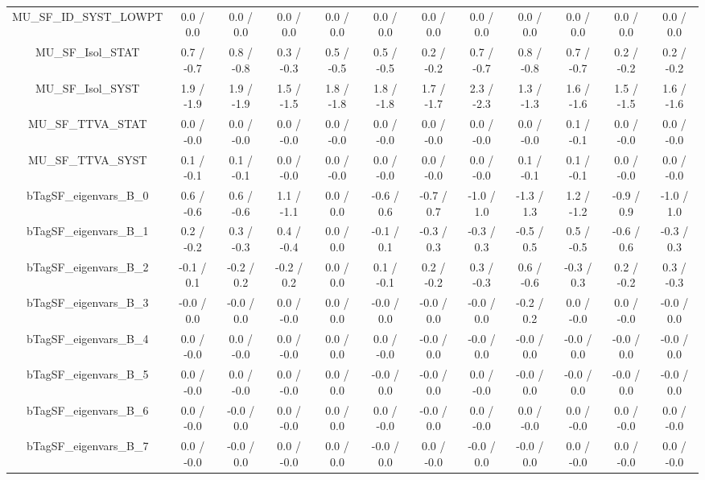 \begin{table}[htbp]
\begin{center}
\begin{tabular}{|c|c|c|c|c|c|c|c|c|c|c|c|}
  MU_SF_ID_SYST_LOWPT & 0.0 / 0.0 & 0.0 / 0.0 & 0.0 / 0.0 & 0.0 / 0.0 & 0.0 / 0.0 & 0.0 / 0.0 & 0.0 / 0.0 & 0.0 / 0.0 & 0.0 / 0.0 & 0.0 / 0.0 & 0.0 / 0.0 \\ 
  MU_SF_Isol_STAT & 0.7 / -0.7 & 0.8 / -0.8 & 0.3 / -0.3 & 0.5 / -0.5 & 0.5 / -0.5 & 0.2 / -0.2 & 0.7 / -0.7 & 0.8 / -0.8 & 0.7 / -0.7 & 0.2 / -0.2 & 0.2 / -0.2 \\ 
  MU_SF_Isol_SYST & 1.9 / -1.9 & 1.9 / -1.9 & 1.5 / -1.5 & 1.8 / -1.8 & 1.8 / -1.8 & 1.7 / -1.7 & 2.3 / -2.3 & 1.3 / -1.3 & 1.6 / -1.6 & 1.5 / -1.5 & 1.6 / -1.6 \\ 
  MU_SF_TTVA_STAT & 0.0 / -0.0 & 0.0 / -0.0 & 0.0 / -0.0 & 0.0 / -0.0 & 0.0 / -0.0 & 0.0 / -0.0 & 0.0 / -0.0 & 0.0 / -0.0 & 0.1 / -0.1 & 0.0 / -0.0 & 0.0 / -0.0 \\ 
  MU_SF_TTVA_SYST & 0.1 / -0.1 & 0.1 / -0.1 & 0.0 / -0.0 & 0.0 / -0.0 & 0.0 / -0.0 & 0.0 / -0.0 & 0.0 / -0.0 & 0.1 / -0.1 & 0.1 / -0.1 & 0.0 / -0.0 & 0.0 / -0.0 \\ 
  bTagSF_eigenvars_B_0 & 0.6 / -0.6 & 0.6 / -0.6 & 1.1 / -1.1 & 0.0 / 0.0 & -0.6 / 0.6 & -0.7 / 0.7 & -1.0 / 1.0 & -1.3 / 1.3 & 1.2 / -1.2 & -0.9 / 0.9 & -1.0 / 1.0 \\ 
  bTagSF_eigenvars_B_1 & 0.2 / -0.2 & 0.3 / -0.3 & 0.4 / -0.4 & 0.0 / 0.0 & -0.1 / 0.1 & -0.3 / 0.3 & -0.3 / 0.3 & -0.5 / 0.5 & 0.5 / -0.5 & -0.6 / 0.6 & -0.3 / 0.3 \\ 
  bTagSF_eigenvars_B_2 & -0.1 / 0.1 & -0.2 / 0.2 & -0.2 / 0.2 & 0.0 / 0.0 & 0.1 / -0.1 & 0.2 / -0.2 & 0.3 / -0.3 & 0.6 / -0.6 & -0.3 / 0.3 & 0.2 / -0.2 & 0.3 / -0.3 \\ 
  bTagSF_eigenvars_B_3 & -0.0 / 0.0 & -0.0 / 0.0 & 0.0 / -0.0 & 0.0 / 0.0 & -0.0 / 0.0 & -0.0 / 0.0 & -0.0 / 0.0 & -0.2 / 0.2 & 0.0 / -0.0 & 0.0 / -0.0 & -0.0 / 0.0 \\ 
  bTagSF_eigenvars_B_4 & 0.0 / -0.0 & 0.0 / -0.0 & 0.0 / -0.0 & 0.0 / 0.0 & 0.0 / -0.0 & -0.0 / 0.0 & -0.0 / 0.0 & -0.0 / 0.0 & -0.0 / 0.0 & -0.0 / 0.0 & -0.0 / 0.0 \\ 
  bTagSF_eigenvars_B_5 & 0.0 / -0.0 & 0.0 / -0.0 & 0.0 / -0.0 & 0.0 / 0.0 & -0.0 / 0.0 & -0.0 / 0.0 & 0.0 / -0.0 & -0.0 / 0.0 & -0.0 / 0.0 & -0.0 / 0.0 & -0.0 / 0.0 \\ 
  bTagSF_eigenvars_B_6 & 0.0 / -0.0 & -0.0 / 0.0 & 0.0 / -0.0 & 0.0 / 0.0 & 0.0 / -0.0 & -0.0 / 0.0 & 0.0 / -0.0 & 0.0 / -0.0 & 0.0 / -0.0 & 0.0 / -0.0 & 0.0 / -0.0 \\ 
  bTagSF_eigenvars_B_7 & 0.0 / -0.0 & -0.0 / 0.0 & 0.0 / -0.0 & 0.0 / 0.0 & -0.0 / 0.0 & 0.0 / -0.0 & -0.0 / 0.0 & -0.0 / 0.0 & 0.0 / -0.0 & 0.0 / -0.0 & 0.0 / -0.0 \\ 

\end{tabular}
\end{center}
\end{table}

